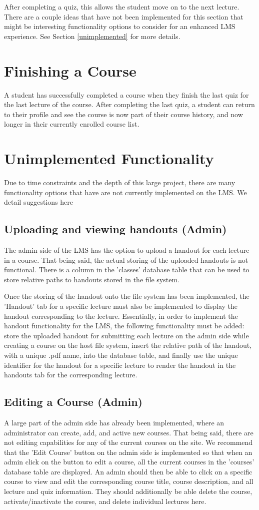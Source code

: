 \documentclass[12pt]{article}
\begin{document}
After completing a quiz, this allows the student move on to the next lecture. There are a couple ideas that have not been implemented for this section that might be interesting functionality options to consider for an enhanced LMS experience. See Section \ref{unimplemented} for more details.

\section{Finishing a Course}
A student has successfully completed a course when they finish the last quiz for the last lecture of the course. After completing the last quiz, a student can return to their profile and see the course is now part of their course history, and now longer in their currently enrolled course list.

\section{Unimplemented Functionality \label{unimplemented}}
Due to time constraints and the depth of this large project, there are many functionality options that have are not currently implemented on the LMS. We detail suggestions here
\subsection{Uploading and viewing handouts (Admin)}
The admin side of the LMS has the option to upload a handout for each lecture in a course. That being said, the actual storing of the uploaded handouts is not functional. There is a column in the 'classes' database table that can be used to store relative paths to handouts stored in the file system. 

Once the storing of the handout onto the file system has been implemented, the 'Handout' tab for a specific lecture must also be implemented to display the handout corresponding to the lecture. Essentially, in order to implement the handout functionality for the LMS, the following functionality must be added: store the uploaded handout for submitting each lecture on the admin side while creating a course on the host file system, insert the relative path of the handout, with a unique .pdf name, into the database table, and finally use the unique identifier for the handout for a specific lecture to render the handout in the handouts tab for the corresponding lecture.
\subsection{Editing a Course (Admin)}
A large part of the admin side has already been implemented, where an administrator can create, add, and active new courses. That being said, there are not editing capabilities for any of the current courses on the site. We recommend that the 'Edit Course' button on the admin side is implemented so that when an admin click on the button to edit a course, all the current courses in the 'courses' database table are displayed. An admin should then be able to click on a specific course to view and edit the corresponding course title, course description, and all lecture and quiz information. They should additionally be able delete the course, activate/inactivate the course, and delete individual lectures here.
\end{document}
